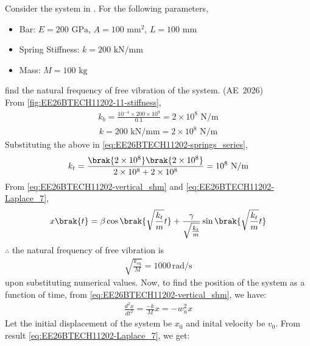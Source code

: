 \item
	Consider the system 
	in
.
For the following parameters,
\begin{itemize}
    \item Bar: $E = 200\text{ GPa}$, $A = 100\text{ mm}^2$, $L = 100\text{ mm}$
    \item Spring Stiffness: $k = 200\text{ kN/mm}$
    \item Mass: $M = 100\text{ kg}$
\end{itemize}
find the natural frequency of free vibration of the system. 
\hfill (AE~2026)
\\
\solution 
From 
\eqref{fig:EE26BTECH11202-11-stiffness},  
\begin{align}
k_{b} = \frac{10^{-4} \times 200 \times 10^9}{0.1} = 2 \times 10^8 \text{ N/m}
\end{align}
\begin{align}
k = 200 \text{ kN/mm} = 2 \times 10^8 \text{ N/m}
\end{align}
Substituting the above  in \eqref{eq:EE26BTECH11202-springs_series}, 
\begin{align}
k_t = \frac{\brak{2 \times 10^8}\brak{2 \times 10^8}}{2 \times 10^8 + 2 \times 10^8} = 10^8 \text{ N/m}
\end{align}
From 
	\eqref{eq:EE26BTECH11202-vertical_shm}
and
\eqref{eq:EE26BTECH11202-Laplace_7}, 
\begin{align}
	x\brak{t}=\beta \cos\brak{\sqrt{\frac{k_t}{m}} t} + \frac{\gamma}{\sqrt{\frac{k_t}{m}}}\sin\brak{\sqrt{\frac{k_t}{m}} t} 
\end{align}
$\therefore$ the natural frequency of free vibration is
\begin{align}
 \sqrt{\frac{k_{\text{eq}}}{M}} =  1000\, \text{rad/s}
\end{align}
upon substituting numerical values.
\iffalse
Now, to find the position of the system as a function of time, from \eqref{eq:EE26BTECH11202-vertical_shm}, we have:
\begin{align}
\frac{d^2 x}{d t^2} = \frac{-k}{M}x = -w_n^2x
\end{align}
Let the initial displacement of the system be $x_0$ and inital velocity be $v_0$. From result \eqref{eq:EE26BTECH11202-Laplace_7}, we get:

